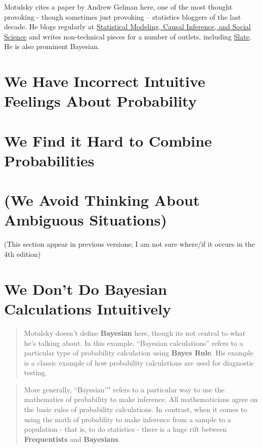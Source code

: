 \documentclass[]{book}
\theoremstyle{definition}
\theoremstyle{definition}
\theoremstyle{definition}
\theoremstyle{remark}
\begin{document}
Motulsky cites a paper by Andrew Gelman here, one of the most thought
provoking - though sometimes just provoking -- statistics bloggers of
the last decade. He blogs regularly at
\href{http://andrewgelman.com/}{Statistical Modeling, Causal Inference,
and Social Science} and writes non-technical pieces for a number of
outlets, including
\href{http://www.slate.com/authors.andrew_gelman.html}{Slate}. He is
also prominent Bayesian.

\section{We Have Incorrect Intuitive Feelings About
Probability}\label{we-have-incorrect-intuitive-feelings-about-probability}

\section{We Find it Hard to Combine
Probabilities}\label{we-find-it-hard-to-combine-probabilities}

\section{(We Avoid Thinking About Ambiguous
Situations)}\label{we-avoid-thinking-about-ambiguous-situations}

(This section appear in previous versions; I am not sure where/if it
occurs in the 4th edition)

\section{We Don't Do Bayesian Calculations
Intuitively}\label{we-dont-do-bayesian-calculations-intuitively}

\begin{quote}
Motulsky doesn't define \textbf{Bayesian} here, though its not central
to what he's talking about. In this example, ``Bayesian calculations''
refers to a particular type of probability calculation using
\textbf{Bayes Rule}. His example is a classic example of how probability
calculations are used for diagnostic testing.
\end{quote}

\begin{quote}
More generally, ``Bayesian''" refers to a particular way to use the
mathematics of probability to make inference. All mathematicians agree
on the basic rules of probability calculations. In contrast, when it
comes to using the math of probablity to make inference from a sample to
a population - that is, to do statistics - there is a huge rift between
\textbf{Frequentists} and \textbf{Bayesians}.
\end{quote}
\end{document}
